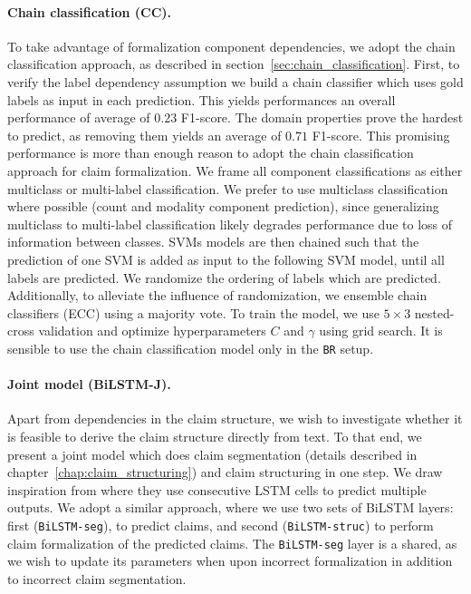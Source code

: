 \paragraph{Chain classification (CC). }
To take advantage of formalization component dependencies, we adopt the chain
classification approach, as described in
section~\ref{sec:chain_classification}.
First, to verify the label dependency assumption we build a chain classifier
which uses gold  labels as input in each prediction.  
This yields performances an overall performance of average of $0.23$ F1-score. 
The domain properties prove the hardest to predict, as removing them yields
an average of $0.71$ F1-score. 
This promising performance is more than enough reason to adopt the
chain classification approach for claim formalization. 
We frame all component classifications as either multiclass or multi-label classification.
We prefer to use multiclass classification where possible 
(count and modality component prediction), since
generalizing multiclass to multi-label classification likely degrades performance
due to loss of information between classes. 
SVMs models are then chained such that the prediction of one SVM is added as
input to the following SVM model, until all labels are predicted. 
We randomize the ordering of labels which are predicted.
Additionally, to alleviate the influence of randomization, we 
ensemble chain classifiers (ECC) using a majority vote. 
To train the model, we use $5 \times 3$ nested-cross validation
and optimize hyperparameters $C$ and $\gamma$ using grid search. 
It is sensible to use the chain classification model only in the
\texttt{BR} setup.

\paragraph{Joint model (BiLSTM-J). } 
Apart from dependencies in the claim structure, we wish to investigate whether
it is feasible to derive the claim structure directly from text. 
To that end, we present a joint model which does claim segmentation (details described in
chapter~\ref{chap:claim_structuring}) and claim structuring in one step. We
draw inspiration from \citep{miwa2016end} where they use consecutive
LSTM cells to predict multiple outputs. We adopt a similar approach, where we
use two sets of BiLSTM layers: first (\texttt{BiLSTM-seg}), to predict claims, and
second (\texttt{BiLSTM-struc}) to perform claim formalization of the predicted claims. The
\texttt{BiLSTM-seg} layer is a shared, as we wish to update its parameters
when upon incorrect formalization in addition to incorrect claim segmentation.

